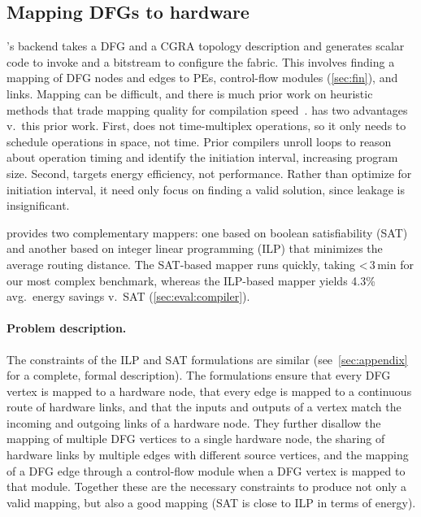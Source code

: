 \subsection{Mapping DFGs to hardware}
\label{sec:compiler:map}
\riptide's backend takes a DFG and a CGRA topology description and generates
scalar code to invoke \riptide and a bitstream to configure the \riptide fabric.
% 
This involves finding a mapping of DFG nodes and edges to PEs, control-flow modules (\autoref{sec:fin}), and links.
% 
Mapping can be difficult, and there is much prior work on heuristic methods
that trade mapping quality for compilation speed~\cite{karunaratne2018dnestmap,hamzeh2012epimap,hamzeh2014branch,amp2020,4dcgra,himap,lee2021ultra,chordmap,pathseeker}.
% 
\riptide has two advantages v.\ this prior work.
% 
First, \riptide does not time-multiplex operations, so it only needs to schedule operations in space, not time.
%
Prior compilers unroll loops to reason about operation timing and identify the initiation interval, increasing program size.
% 
Second, \riptide targets energy efficiency, not performance.
% 
Rather than optimize for initiation interval, it need only focus on finding a valid solution, since leakage is insignificant. 

\riptide provides two complementary mappers: one based on boolean satisfiability (SAT) and another based on integer linear programming (ILP) that minimizes the average routing distance.
%
The SAT-based mapper runs quickly, taking <\,3\,min for our most complex benchmark,
whereas the ILP-based mapper yields 4.3\% avg.\ energy savings v.\ SAT (\autoref{sec:eval:compiler}).

\paragraph{Problem description.}
The constraints of the ILP and SAT formulations are similar (see~\autoref{sec:appendix} for a complete, formal description).
%
The formulations ensure that every DFG vertex is mapped to a hardware node, that every edge is mapped to a continuous route of hardware links, and that the inputs and outputs of a vertex match the incoming and outgoing links of a hardware node. 
% 
They further disallow the mapping of multiple DFG vertices to a single hardware node, the sharing of hardware links by multiple edges with different source vertices, and the mapping of a DFG edge through a control-flow module when a DFG vertex is mapped to that module.
% 
Together these are the necessary constraints to produce not only a valid mapping, but also a good mapping (SAT is close to ILP in terms of energy).
% 
% 

